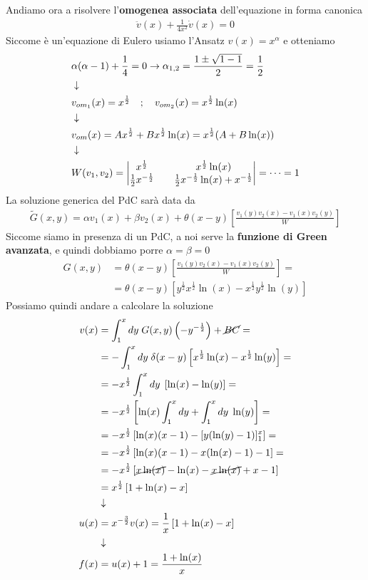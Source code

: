 Andiamo ora a risolvere l'\textbf{omogenea associata} dell'equazione in forma canonica
\begin{align}
	\ddot{v}(x) + \frac{1}{4x^2} \dot{v}(x)  = 0
\end{align}
Siccome è un'equazione di Eulero usiamo l'Ansatz $v(x) = x^\alpha$ e otteniamo
\begin{align}
	&\alpha(\alpha-1) + \frac{1}{4} = 0 \to \alpha_{1,2} = \frac{1\pm \sqrt{1-1}}{2} = \frac{1}{2} \\ &\downarrow \nonumber \\
	&v_{{om}_1}(x) = x^{\frac{1}{2}} \quad ; \quad v_{{om}_2}(x) = x^{\frac{1}{2}} \ln(x) \nonumber \\ &\downarrow \nonumber \\
	&v_{om}(x) = Ax^{\frac{1}{2}} + Bx^{\frac{1}{2}}\ln(x) = x^{\frac{1}{2}}(A + B\ln(x)) \\ &\downarrow \nonumber \\
	&W(v_1,v_2) = \begin{vmatrix}
		x^{\frac{1}{2}} && x^{\frac{1}{2}}\ln(x)\\
		\frac{1}{2} x^{-\frac{1}{2}} && \frac{1}{2} x^{-\frac{1}{2}} \ln(x) + x^{-\frac{1}{2}}
	\end{vmatrix} = \dots = 1
\end{align}
La soluzione generica del PdC sarà data da
\begin{align}
	\tilde{G}(x,y) = \alpha v_1(x) + \beta v_2(x) + \theta(x-y)\left[ \frac{v_1(y) v_2(x) -v_1(x)v_2(y)}{W} \right] 
\end{align}
Siccome siamo in presenza di un PdC, a noi serve la \textbf{funzione di Green avanzata}, e quindi dobbiamo porre $\alpha=\beta=0$
\begin{align}
	G(x,y) &= \theta(x-y)\left[ \frac{v_1(y) v_2(x) -v_1(x)v_2(y)}{W} \right] = \nonumber \\
		   &= \theta(x-y)\left[ y^{\frac{1}{2}} x^{\frac{1}{2}} \ln(x) -x^{\frac{1}{2}}y^{\frac{1}{2}} \ln(y) \right] 
\end{align}
Possiamo quindi andare a calcolare la soluzione
\begin{align}
	v(x) &= \int_{1}^{x} dy \; G(x,y) \left( -y^{-\frac{1}{2}} \right) + \cancel{BC} = \nonumber\\
		 &= -\int_{1}^{x} dy \; \delta(x-y)\left[ x^{\frac{1}{2}} \ln(x) -x^{\frac{1}{2}} \ln(y) \right]= \nonumber\\
		 &= -x^{\frac{1}{2}}\int_{1}^{x} dy \; \left[ \ln(x) - \ln(y) \right] = \nonumber\\
		 &= -x^{\frac{1}{2}} \left[\ln(x)\int_{1}^{x} dy + \int_{1}^{x} dy\; \ln(y)\right] = \nonumber\\
		 &= -x^{\frac{1}{2}} \left[\ln(x)(x-1) - [y(\ln(y) -1)]_1^x \right] = \nonumber\\
		 &= -x^{\frac{1}{2}} \left[\ln(x)(x-1) - x(\ln(x) -1) -1 \right] = \nonumber\\
		 &= -x^{\frac{1}{2}} \left[\cancel{x\ln(x)} -\ln(x) - \cancel{x\ln(x)} +x -1 \right] \nonumber\\
		 &= x^{\frac{1}{2}} \left[1 +\ln(x)-x \right] \\ &\downarrow \nonumber \\
	u(x) &= x^{-\frac{3}{2}} v(x) = \frac{1}{x} \left[1 +\ln(x)-x \right] \\ &\downarrow \nonumber \\
	f(x) &= u(x) + 1 = \frac{1 + \ln(x)}{x}
\end{align}
